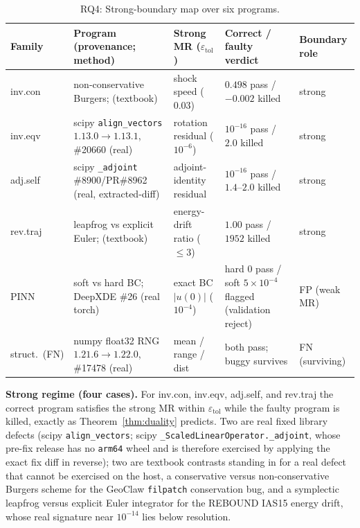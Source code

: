 \documentclass[review,12pt,authoryear]{elsarticle}
\begin{document}
{\def\LTcaptype{table} %
\begin{longtable}[]{@{}p{1.6cm}p{3.4cm}p{2.5cm}p{2.6cm}p{1.7cm}@{}}
\caption{RQ4: Strong-boundary map over six programs.}\label{tab:p2-30}\\
\toprule\noalign{}
Family & Program (provenance; method) & Strong MR ($\varepsilon_{\mathrm{tol}}$) & Correct / faulty verdict & Boundary role \\
\midrule\noalign{}
\endfirsthead
\endhead
\bottomrule\noalign{}
\endlastfoot
inv.con & non-conservative Burgers; \citep{hou1994nonconservative} (textbook) & shock speed ($0.03$) & $0.498$ pass / $-0.002$ killed & strong \\
inv.eqv & scipy \texttt{align\_vectors} $1.13.0\to1.13.1$, \#20660 (real) & rotation residual ($10^{-6}$) & $10^{-16}$ pass / $2.0$ killed & strong \\
adj.self & scipy \texttt{\_adjoint} \#8900/PR\#8962 (real, extracted-diff) & adjoint-identity residual & $10^{-16}$ pass / $1.4$--$2.0$ killed & strong \\
rev.traj & leapfrog vs explicit Euler; \citep{hairer2006geometric} (textbook) & energy-drift ratio ($\leq 3$) & $1.00$ pass / $1952$ killed & strong \\
PINN & soft vs hard BC; DeepXDE \#26 (real torch) & exact BC $|u(0)|$ ($10^{-4}$) & hard $0$ pass / soft $5\times10^{-4}$ flagged (validation reject) & FP (weak MR) \\
struct.\ (FN) & numpy float32 RNG $1.21.6\to1.22.0$, \#17478 (real) & mean / range / dist & both pass; buggy survives & FN (surviving) \\
\end{longtable}
}

\textbf{Strong regime (four cases).} For inv.con, inv.eqv, adj.self, and
rev.traj the correct program satisfies the strong MR within
$\varepsilon_{\mathrm{tol}}$ while the faulty program is killed, exactly
as Theorem~\ref{thm:duality} predicts. Two are real fixed library defects (scipy
\texttt{align\_vectors}; scipy \texttt{\_ScaledLinearOperator.\_adjoint},
whose pre-fix release has no \texttt{arm64} wheel and is therefore
exercised by applying the exact fix diff in reverse); two are textbook
contrasts standing in for a real defect that cannot be exercised on the
host, a conservative versus non-conservative Burgers scheme for the
GeoClaw \texttt{filpatch} conservation bug, and a symplectic leapfrog
versus explicit Euler integrator for the REBOUND IAS15 energy drift, whose
real signature near $10^{-14}$ lies below resolution.
\end{document}
